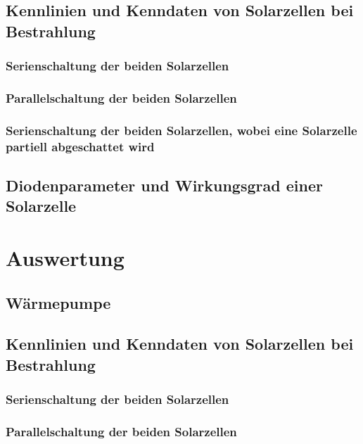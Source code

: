 \documentclass[12pt,english,ngerman]{scrartcl}
\begin{document}
\subsection{Kennlinien und Kenndaten von Solarzellen bei Bestrahlung}

\subsubsection{Serienschaltung der beiden Solarzellen}

\subsubsection{Parallelschaltung der beiden Solarzellen}


\subsubsection{Serienschaltung der beiden Solarzellen, wobei eine Solarzelle partiell abgeschattet wird}

\subsection{Diodenparameter und Wirkungsgrad einer Solarzelle}




\section{Auswertung}\label{sec:auswertung}

\subsection{Wärmepumpe}

\subsection{Kennlinien und Kenndaten von Solarzellen bei Bestrahlung}

\subsubsection{Serienschaltung der beiden Solarzellen}

\subsubsection{Parallelschaltung der beiden Solarzellen}
\end{document}
